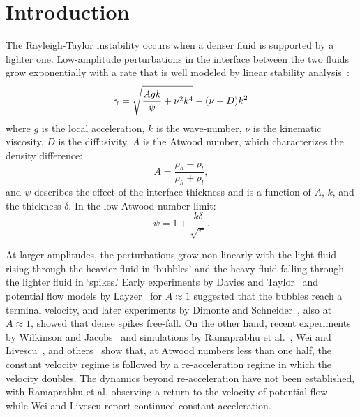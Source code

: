 \section{Introduction}

The Rayleigh-Taylor instability occurs when a denser fluid is supported by a lighter one.
Low-amplitude perturbations in the interface between the two fluids grow exponentially with a rate that is well modeled by linear stability analysis~\cite{Duff1962}:
\begin{equation} \elabel{duff}
\gamma = \sqrt{\frac{Agk}{\psi} + \nu^2 k^4} - (\nu + D) k^2
\end{equation}
where 
$g$ is the local acceleration,
$k$ is the wave-number,
$\nu$ is the kinematic viscosity,
$D$ is the diffusivity,
$A$ is the Atwood number, which characterizes the density difference:
\begin{equation}
	A = \frac{\rho_h - \rho_l}{\rho_h + \rho_l},
\end{equation}
and $\psi$ describes the effect of the interface thickness and is a function of $A$, $k$, and the thickness $\delta$.
In the low Atwood number limit:
\begin{equation}
	\psi = 1 + \frac{k \delta}{\sqrt{\pi}} .
\end{equation}

At larger amplitudes, the perturbations grow non-linearly with the light fluid rising through the heavier fluid in `bubbles' and the heavy fluid falling through the lighter fluid in `spikes.'
Early experiments by Davies and Taylor~\cite{Davies1950a} and potential flow models by Layzer~\cite{Layzer1955} for $A \approx 1$ suggested that the bubbles reach a terminal velocity, and later experiments by Dimonte and Schneider~\cite{Dimonte1996}, also at $A \approx 1$, showed that dense spikes free-fall.
On the other hand, recent experiments by Wilkinson and Jacobs~\cite{Wilkinson2007} and simulations by Ramaprabhu et al.~\cite{Ramaprabhu2006,Ramaprabhu2012}, Wei and Livescu~\cite{Wei2012}, and others~\cite{Sohn2011} show that, at Atwood numbers less than one half, the constant velocity regime is followed by a re-acceleration regime in which the velocity doubles.
The dynamics beyond re-acceleration have not been established, with Ramaprabhu et al. observing a return to the velocity of potential flow~\cite{Goncharov2002} while Wei and Livescu report continued constant acceleration.

